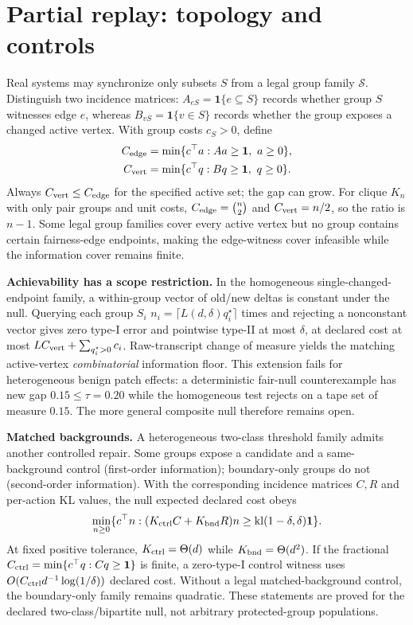 \section{Partial replay: topology and controls}
Real systems may synchronize only subsets $S$ from a legal group family $\mathcal S$. Distinguish two incidence matrices: $A_{eS}=\mathbf1\{e\subseteq S\}$ records whether group $S$ witnesses edge $e$, whereas $B_{vS}=\mathbf1\{v\in S\}$ records whether the group exposes a changed active vertex. With group costs $c_S>0$, define
\begin{align}\label{eq:covers}
C_{\rm edge}&=\min\{c^\top a:Aa\ge\mathbf1,\ a\ge0\},\\
C_{\rm vert}&=\min\{c^\top q:Bq\ge\mathbf1,\ q\ge0\}.
\end{align}
Always $C_{\rm vert}\le C_{\rm edge}$ for the specified active set; the gap can grow. For clique $K_n$ with only pair groups and unit costs, $C_{\rm edge}=\binom n2$ and $C_{\rm vert}=n/2$, so the ratio is $n-1$. Some legal group families cover every active vertex but no group contains certain fairness-edge endpoints, making the edge-witness cover infeasible while the information cover remains finite.

\textbf{Achievability has a scope restriction.} In the homogeneous single-changed-endpoint family, a within-group vector of old/new deltas is constant under the null. Querying each group $S_i$ $n_i=\lceil L(d,\delta)q_i^\star\rceil$ times and rejecting a nonconstant vector gives zero type-I error and pointwise type-II at most $\delta$, at declared cost at most $L C_{\rm vert}+\sum_{q_i^\star>0}c_i$. Raw-transcript change of measure yields the matching active-vertex \emph{combinatorial} information floor. This extension fails for heterogeneous benign patch effects: a deterministic fair-null counterexample has new gap $0.15\le\tau=0.20$ while the homogeneous test rejects on a tape set of measure $0.15$. The more general composite null therefore remains open.

\textbf{Matched backgrounds.} A heterogeneous two-class threshold family admits another controlled repair. Some groups expose a candidate and a same-background control (first-order information); boundary-only groups do not (second-order information). With the corresponding incidence matrices $C,R$ and per-action KL values, the null expected declared cost obeys
\begin{equation}\label{eq:p19-lp}
\min_{n\ge0}\{c^\top n:(K_{\rm ctrl}C+K_{\rm bnd}R)n\ge\mathrm{kl}(1-\delta,\delta)\mathbf1\}.
\end{equation}
At fixed positive tolerance, $K_{\rm ctrl}=\Theta(d)$ while $K_{\rm bnd}=\Theta(d^2)$. If the fractional $C_{\rm ctrl}=\min\{c^\top q:Cq\ge\mathbf1\}$ is finite, a zero-type-I control witness uses $O(C_{\rm ctrl}d^{-1}\log(1/\delta))$ declared cost. Without a legal matched-background control, the boundary-only family remains quadratic. These statements are proved for the declared two-class/bipartite null, not arbitrary protected-group populations.

